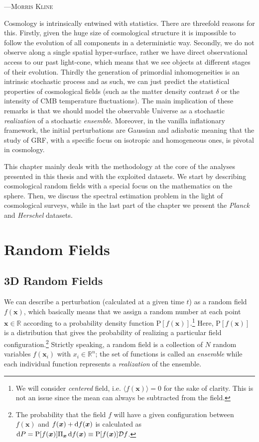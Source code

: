 \setlength{\epigraphwidth}{.57\textwidth}
\begin{epigraphs}
%
 {---\textsc{Morris Kline}}
\end{epigraphs}
Cosmology is intrinsically entwined with statistics. There are threefold reasons for this. Firstly, given the huge size of cosmological structure it is impossible to follow the evolution of all components in a deterministic way. Secondly, we do not observe  along a single spatial hyper-surface, rather we have direct observational access to our past light-cone, which means that we see objects at different stages of their evolution. Thirdly the generation of primordial inhomogeneities is an intrinsic stochastic process and as such, we can just predict the statistical properties of cosmological fields (such as the matter density contrast $\delta$ or the intensity of \gls{CMB} temperature fluctuations). The main implication of these remarks is that we should model the observable Universe as a stochastic \emph{realization} of a stochastic \emph{ensemble}. Moreover, in the vanilla inflationary framework, the initial perturbations are Gaussian and adiabatic meaning that the study of \gls{GRF}, with a specific focus on isotropic and homogeneous ones, is pivotal in cosmology. 

This chapter mainly deals with the methodology at the core of the analyses presented in this thesis and with the exploited datasets. We start by describing cosmological random fields with a special focus on the mathematics on the sphere. Then, we discuss the spectral estimation problem in the light of cosmological surveys, while in the last part of the chapter we present the \textit{Planck} and \textit{Herschel} datasets. 


\section{Random Fields}
\label{sec:RF}

\subsection{3D Random Fields}
We can describe a perturbation (calculated at a given time $t$) as a random field $f(\bm{x})$, which basically means that we assign a random number at each point $\bm{x} \in \mathbb{R}$ according to a probability density function $\text{P}[f(\bm{x})]$.\footnote{We will consider \emph{centered} field, i.e. $\langle f(\bm{x})\rangle=0$ for the sake of clarity. This is not an issue since the mean can always be subtracted from the field.} Here, $\text{P}[f(\bm{x})]$ is a distribution that gives the probability of realizing a particular field configuration.\footnote{The probability that the field $f$ will have a given configuration between $f(\bm{x})$ and $f(\bm{x})+\mathop{}\!\mathrm{d} f(\bm{x})$ is calculated as $\mathop{}\!\mathrm{d} P=\text{P}[f(\bm{x})]\Pi_{\bm{x}}\mathop{}\!\mathrm{d} f(\bm{x})\equiv \text{P}[f(\bm{x})]\mathcal{D}f$.} Strictly speaking, a random field is a collection of $N$ random variables $f(\bm{x}_i)$ with $x_i \in \mathbb{R}^n$; the set of functions is called an \emph{ensemble} while each individual function represents a \emph{realization} of the ensemble. 

